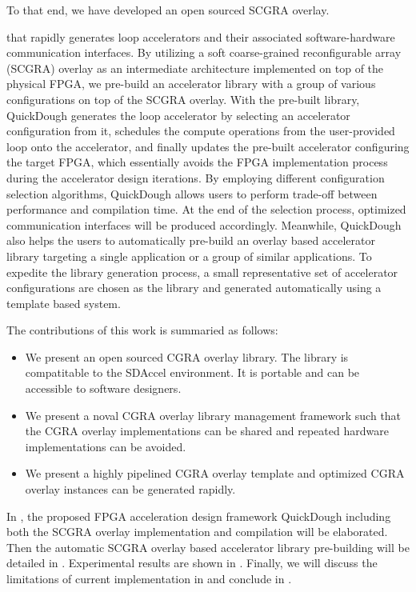 To that end, we have developed an open sourced SCGRA overlay. 
 
that rapidly generates loop accelerators and their associated software-hardware communication interfaces. By utilizing a soft coarse-grained reconfigurable array (SCGRA) overlay as an intermediate architecture implemented on top of the physical FPGA, we pre-build an accelerator library with a group of various configurations on top of the SCGRA overlay. With the pre-built library, QuickDough generates the loop accelerator by selecting an accelerator configuration from it, schedules the compute operations from the user-provided loop onto the accelerator, and finally updates the pre-built accelerator configuring the target FPGA, which essentially avoids the FPGA implementation process during the accelerator design iterations. By employing different configuration selection algorithms, QuickDough allows users to perform trade-off between performance and compilation time. At the end of the selection process, optimized communication interfaces will be produced accordingly. Meanwhile, QuickDough also helps the users to automatically pre-build an overlay based accelerator library targeting a single application or a group of similar applications. To expedite the library generation process, a small representative set of accelerator configurations are chosen as the library and generated automatically using a template based system.

The contributions of this work is summaried as follows:
\begin{itemize}
    \item We present an open sourced CGRA overlay library. The library is compatitable 
        to the SDAccel environment. It is portable and can be accessible to software designers.
    \item We present a noval CGRA overlay library management framework such that 
        the CGRA overlay implementations can be shared and repeated hardware implementations can be avoided.
    \item We present a highly pipelined CGRA overlay template and optimized CGRA overlay instances can 
        be generated rapidly.
\end{itemize}

In , the proposed FPGA acceleration design framework QuickDough including both the SCGRA overlay implementation and compilation will be elaborated. Then the automatic SCGRA overlay based accelerator library pre-building will be detailed in . Experimental results are shown in . Finally, we will discuss the limitations of current implementation in  and conclude in .
